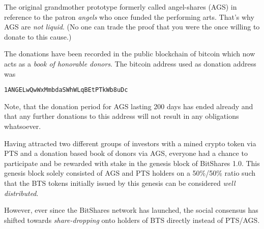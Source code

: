 The original grandmother prototype formerly called angel-shares (AGS) in
reference to the patron \emph{angels} who once funded the performing arts.
That's why AGS are \emph{not liquid}. (No one can trade the proof that you were
the once willing to donate to this cause.) 

The donations have been recorded in the public blockchain of bitcoin which now
acts as a \emph{book of honorable donors}. The bitcoin address used as donation
address was 
\begin{center}
 \texttt{1ANGELwQwWxMmbdaSWhWLqBEtPTkWb8uDc}
\end{center}
Note, that the donation period for AGS lasting 200 days has ended already and
that any further donations to this address will not result in any obligations
whatsoever.

\bigskip

Having attracted two different groups of investors with a mined crypto token
via PTS and a donation based book of donors via AGS, everyone had a chance to
participate and be rewarded with stake in the genesis block of BitShares 1.0.
This genesis block solely consisted of AGS and PTS holders on a 50\%/50\% ratio
such that the BTS tokens initially issued by this genesis can be considered
\emph{well distributed}.

However, ever since the BitShares network has launched, the social consensus
has shifted towards \emph{share-dropping} onto holders of BTS directly instead
of PTS/AGS.
